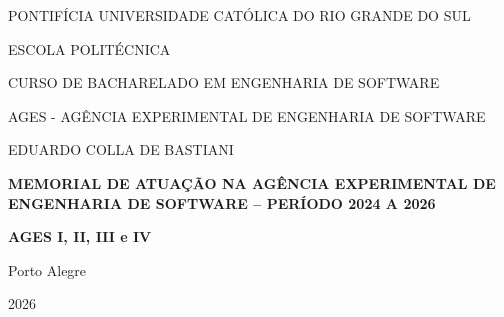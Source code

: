 \begin{center}
PONTIFÍCIA UNIVERSIDADE CATÓLICA DO RIO GRANDE DO SUL\par
ESCOLA POLITÉCNICA\par
CURSO DE BACHARELADO EM ENGENHARIA DE SOFTWARE\par
AGES - AGÊNCIA EXPERIMENTAL DE ENGENHARIA DE SOFTWARE\par
\end{center}
\vfill
\begin{center}
EDUARDO COLLA DE BASTIANI\par
\end{center}
\vfill
\begin{center}
{{\large\textbf{MEMORIAL DE ATUAÇÃO NA AGÊNCIA EXPERIMENTAL DE ENGENHARIA DE SOFTWARE – PERÍODO 2024 A 2026}}}\par
{{\large\textbf{AGES I, II, III e IV}}}\par
\end{center}
\vfill
\begin{center}
Porto Alegre\par
2026\par
\end{center}
